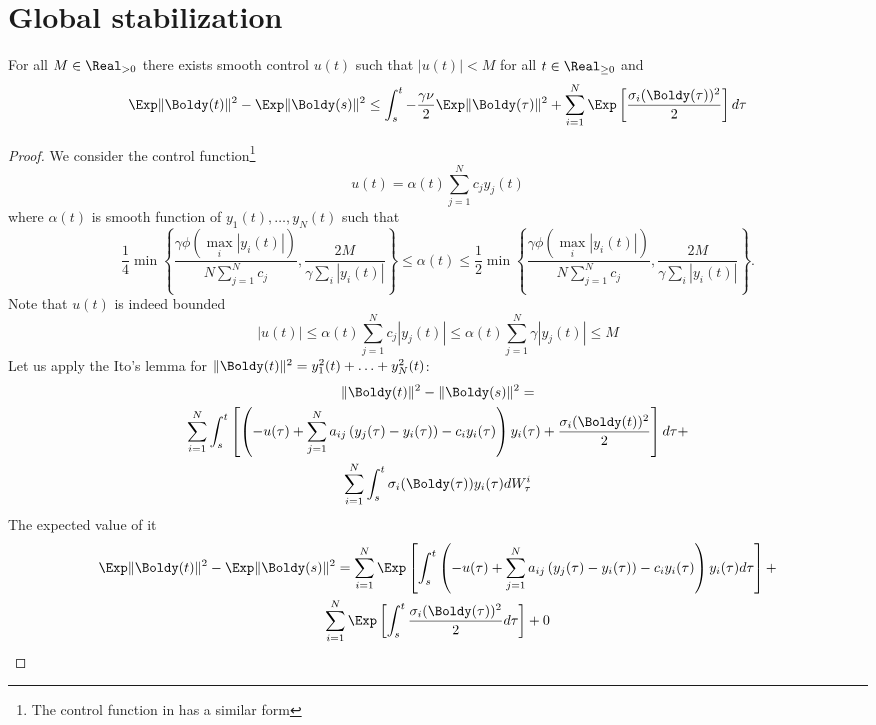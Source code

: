 \section{Global stabilization}

\begin{theorem}\label{thm:global-stabilization}
    For all $M \in \Real_{>0}$ there exists smooth control $u(t)$ such that $|u(t)| < M$ for all $t \in \Real_{\geq 0 }$ and 
    \[
        \Exp \|\Boldy(t)\|^2 - \Exp \|\Boldy(s)\|^2 \leq \int_s^t  - \frac{\gamma \nu }{2} \Exp \|\Boldy(\tau)\|^2   + \sum_{i=1}^N \Exp \left[ \frac{\sigma_i(\Boldy(\tau))^2}{2} \right] d\tau 
    \]
\end{theorem}

\begin{proof}
    We consider the control function\footnote{The control function in \cite{leader_hk} has a similar form}
    \[
        u(t) = \alpha(t) \sum_{j=1}^N c_j y_j(t)
    \]
    where $\alpha(t)$ is smooth function of $y_1(t), \ldots, y_N(t)$ such that 
    \[
        \frac{1}{4} \min \left\{\frac{\gamma\phi\left( \max_{i}\left|y_i(t)\right|\right)}{N  \sum_{j=1}^N c_j}, \frac{2 M}{\gamma \sum_i\left|y_i(t)\right|}\right\} \leq \alpha(t) \leq \frac{1}{2} \min \left\{\frac{\gamma\phi\left( \max_{i}\left|y_i(t)\right|\right)}{N  \sum_{j=1}^N c_j}, \frac{2 M}{\gamma \sum_i\left|y_i(t)\right|}\right\} .
    \]
    Note that $u(t)$ is indeed bounded
    \[
        |u(t)| \leq  \alpha(t) \sum_{j=1}^N c_j |y_j(t)| \leq \alpha(t)  \sum_{j=1}^N \gamma |y_j(t)| \leq M
    \]
    Let us apply the Ito's lemma for $\|\Boldy(t)\|^2 = y_1^2(t) + \ldots + y_N^2(t)$:
    \begin{multline*}
        \|\Boldy(t)\|^2 -  \|\Boldy(s)\|^2 = \\ \sum_{i=1}^N\int_s^t \left[ \left(-u(\tau) + \sum_{j=1}^N a_{i j}\left(y_j(\tau)-y_i(\tau)\right)-c_i y_i(\tau)\right) y_i(\tau) + 
        \frac{\sigma_i(\Boldy(t))^2}{2} \right]d\tau + \\ 
        \sum_{i=1}^N  \int_s^{t}\sigma_i(\Boldy(\tau)) y_i(\tau) dW_{\tau}^i
    \end{multline*}
    The expected value of it
    \begin{multline}\label{eq:ExpIto}
        \Exp \|\Boldy(t)\|^2 -  \Exp \|\Boldy(s)\|^2 =  \sum_{i=1}^N \Exp \left[\int_s^t \left(-u(\tau) + \sum_{j=1}^N a_{i j}\left(y_j(\tau)-y_i(\tau)\right)-c_i y_i(\tau)\right) y_i(\tau) d\tau \right] + \\
        \sum_{i=1}^N \Exp \left[ \int_s^{t} \frac{\sigma_i(\Boldy(\tau))^2}{2} d\tau\right] + 0

\end{multline}
\end{proof}
